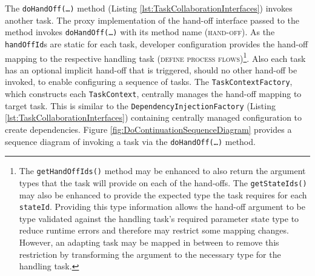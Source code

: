 \documentclass[prodmode]{style/acmlarge}
\begin{document}
The \texttt{doHandOff(\ldots)} method (Listing
\ref{lst:TaskCollaborationInterfaces}) invokes another task.  The proxy
implementation of the hand-off interface passed to the method invokes
\texttt{doHandOff(\ldots)} with its method name (\textsc{hand-off}).  As the
\texttt{handOffId}s are static for each task, developer configuration provides
the hand-off mapping to the respective handling task (\textsc{define process
flows})\footnote{The \texttt{getHandOffIds()} method may be enhanced to also
return the argument types that the task will provide on each of the hand-offs.
The \texttt{getStateIds()} may also be enhanced to provide the expected type the
task requires for each \texttt{stateId}.  Providing this type information allows
the hand-off argument to be type validated against the handling task's required
parameter state type to reduce runtime errors and therefore may restrict some
mapping changes.  However, an adapting task may be mapped in between to remove
this restriction by transforming the argument to the necessary type for the
handling task.}.  Also each task has an optional implicit hand-off that is
triggered, should no other hand-off be invoked, to enable configuring a sequence
of tasks.  The \texttt{TaskContextFactory}, which constructs each
\texttt{TaskContext}, centrally manages the hand-off mapping to target task. 
This is similar to the \texttt{DependencyInjectionFactory} (Listing
\ref{lst:TaskCollaborationInterfaces}) containing centrally managed
configuration to create dependencies.  Figure
\ref{fig:DoContinuationSequenceDiagram} provides a sequence diagram of invoking
a task via the \texttt{doHandOff(\ldots)} method.
\end{document}
